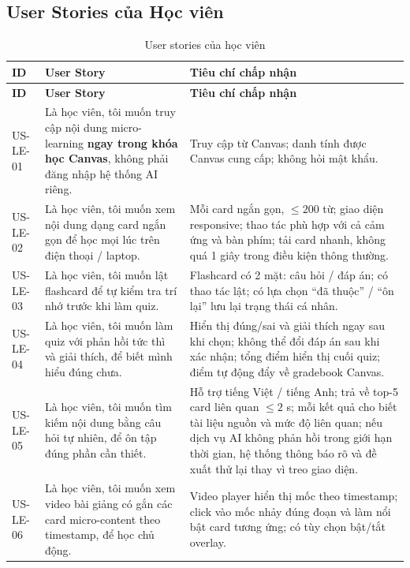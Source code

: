 \subsection{User Stories của Học viên}

\begingroup
\scriptsize
\setlength{\tabcolsep}{3pt}
\begin{longtable}{|p{1.6cm}|p{5.6cm}|p{7cm}|}
\caption{User stories của học viên}
\label{tab:user-stories-hoc-vien}\\
\hline
\textbf{ID} & \textbf{User Story} & \textbf{Tiêu chí chấp nhận} \\
\hline
\endfirsthead
\hline
\textbf{ID} & \textbf{User Story} & \textbf{Tiêu chí chấp nhận} \\
\hline
\endhead
US-LE-01 & Là học viên, tôi muốn truy cập nội dung micro-learning \textbf{ngay trong khóa học Canvas}, không phải đăng nhập hệ thống AI riêng. & Truy cập từ Canvas; danh tính được Canvas cung cấp; không hỏi mật khẩu. \\
\hline
US-LE-02 & Là học viên, tôi muốn xem nội dung dạng card ngắn gọn để học mọi lúc trên điện thoại / laptop. & Mỗi card ngắn gọn, \(\leq 200\) từ; giao diện responsive; thao tác phù hợp với cả cảm ứng và bàn phím; tải card nhanh, không quá 1 giây trong điều kiện thông thường. \\
\hline
US-LE-03 & Là học viên, tôi muốn lật flashcard để tự kiểm tra trí nhớ trước khi làm quiz. & Flashcard có 2 mặt: câu hỏi / đáp án; có thao tác lật; có lựa chọn ``đã thuộc'' / ``ôn lại'' lưu lại trạng thái cá nhân. \\
\hline
US-LE-04 & Là học viên, tôi muốn làm quiz với phản hồi tức thì và giải thích, để biết mình hiểu đúng chưa. & Hiển thị đúng/sai và giải thích ngay sau khi chọn; không thể đổi đáp án sau khi xác nhận; tổng điểm hiển thị cuối quiz; điểm tự động đẩy về gradebook Canvas. \\
\hline
US-LE-05 & Là học viên, tôi muốn tìm kiếm nội dung bằng câu hỏi tự nhiên, để ôn tập đúng phần cần thiết. & Hỗ trợ tiếng Việt / tiếng Anh; trả về top-5 card liên quan \(\leq 2\) s; mỗi kết quả cho biết tài liệu nguồn và mức độ liên quan; nếu dịch vụ AI không phản hồi trong giới hạn thời gian, hệ thống thông báo rõ và đề xuất thử lại thay vì treo giao diện. \\
\hline
US-LE-06 & Là học viên, tôi muốn xem video bài giảng có gắn các card micro-content theo timestamp, để học chủ động. & Video player hiển thị mốc theo timestamp; click vào mốc nhảy đúng đoạn và làm nổi bật card tương ứng; có tùy chọn bật/tắt overlay. \\

\end{longtable}
